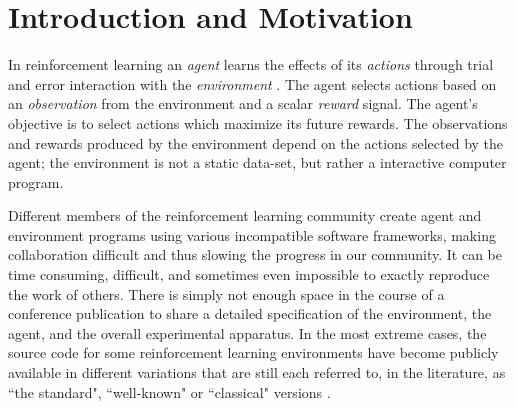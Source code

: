 \documentclass[twoside,11pt]{article}
\begin{document}
\section{Introduction and Motivation}
In reinforcement learning an {\it agent} learns the effects of its {\it actions} through trial and error interaction with the {\it environment} \citep{rlbook, rlsurvey,ndp}. The agent selects actions based on an {\it observation} from the environment and a scalar {\it reward} signal. The agent's objective is to select actions which maximize its future rewards. The observations and rewards produced by the environment depend on the actions selected by the agent; the environment is not a static data-set, but rather a interactive computer program.
 


Different members of the reinforcement learning community create agent and environment programs using various incompatible software frameworks, making collaboration difficult and thus slowing the progress in our community. It  can be time consuming, difficult, and sometimes even impossible to exactly reproduce the work of others.  There is simply not enough space in the course of a conference publication to share a detailed specification of the environment, the agent, and the overall experimental apparatus.
In the most extreme cases, the source code for some reinforcement learning environments have become publicly available in different variations that are still each referred to, in the literature, as ``the standard", ``well-known" or ``classical"  versions \citep{whiteThesis}. %



\end{document}
